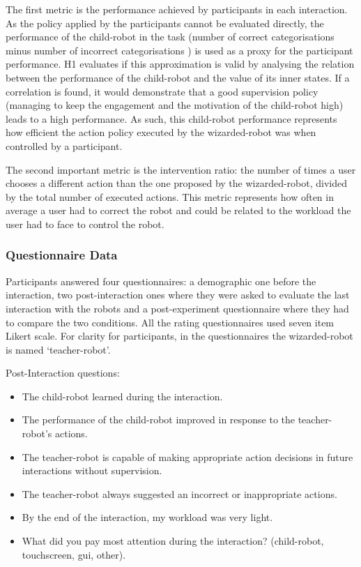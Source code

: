 The first metric is the performance achieved by participants in each interaction. As the policy applied by the participants cannot be evaluated directly, the performance of the child-robot in the task (number of correct categorisations minus number of incorrect categorisations ) is used as a proxy for the participant performance. H1 evaluates if this approximation is valid by analysing the relation between the performance of the child-robot and the value of its inner states. If a correlation is found, it would demonstrate that a good supervision policy (managing to keep the engagement and the motivation of the child-robot high) leads to a high performance. As such, this child-robot performance represents how efficient the action policy executed by the wizarded-robot was when controlled by a participant.

The second important metric is the intervention ratio: the number of times a user chooses a different action than the one proposed by the wizarded-robot, divided by the total number of executed actions. This metric represents how often in average a user had to correct the robot and could be related to the workload the user had to face to control the robot.

\subsubsection{Questionnaire Data}
 
Participants answered four questionnaires: a demographic one before the interaction, two post-interaction ones where they were asked to evaluate the last interaction with the robots and a post-experiment questionnaire where they had to compare the two conditions. All the rating questionnaires used seven item Likert scale. For clarity for participants, in the questionnaires the wizarded-robot is named `teacher-robot'.

Post-Interaction questions:
\begin{itemize}
	\item The child-robot learned during the interaction.
	\item The performance of the child-robot improved in response to the teacher-robot's actions.
	\item The teacher-robot is capable of making appropriate action decisions in future interactions without supervision.
	\item The teacher-robot always suggested an incorrect or inappropriate actions.
	\item By the end of the interaction, my workload was very light.
	\item What did you pay most attention during the interaction? (child-robot, touchscreen, \gls{gui}, other).
\end{itemize}

